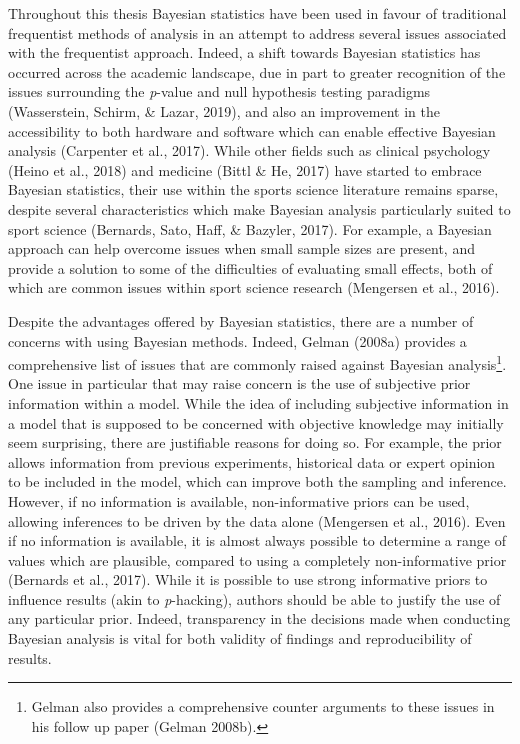 \documentclass[man,floatsintext]{apa6}
\let\rmarkdownfootnote\footnote%
\def\footnote{\protect\rmarkdownfootnote}
\begin{document}
Throughout this thesis Bayesian statistics have been used in favour of traditional frequentist methods of analysis in an attempt to address several issues associated with the frequentist approach.
Indeed, a shift towards Bayesian statistics has occurred across the academic landscape, due in part to greater recognition of the issues surrounding the \emph{p}-value and null hypothesis testing paradigms (Wasserstein, Schirm, \& Lazar, 2019), and also an improvement in the accessibility to both hardware and software which can enable effective Bayesian analysis (Carpenter et al., 2017).
While other fields such as clinical psychology (Heino et al., 2018) and medicine (Bittl \& He, 2017) have started to embrace Bayesian statistics, their use within the sports science literature remains sparse, despite several characteristics which make Bayesian analysis particularly suited to sport science (Bernards, Sato, Haff, \& Bazyler, 2017).
For example, a Bayesian approach can help overcome issues when small sample sizes are present, and provide a solution to some of the difficulties of evaluating small effects, both of which are common issues within sport science research (Mengersen et al., 2016).

Despite the advantages offered by Bayesian statistics, there are a number of concerns with using Bayesian methods.
Indeed, Gelman (2008a) provides a comprehensive list of issues that are commonly raised against Bayesian analysis\footnote{Gelman also provides a comprehensive counter arguments to these issues in his follow up paper (Gelman 2008b).}.
One issue in particular that may raise concern is the use of subjective prior information within a model.
While the idea of including subjective information in a model that is supposed to be concerned with objective knowledge may initially seem surprising, there are justifiable reasons for doing so.
For example, the prior allows information from previous experiments, historical data or expert opinion to be included in the model, which can improve both the sampling and inference.
However, if no information is available, non-informative priors can be used, allowing inferences to be driven by the data alone (Mengersen et al., 2016).
Even if no information is available, it is almost always possible to determine a range of values which are plausible, compared to using a completely non-informative prior (Bernards et al., 2017).
While it is possible to use strong informative priors to influence results (akin to \emph{p}-hacking), authors should be able to justify the use of any particular prior.
Indeed, transparency in the decisions made when conducting Bayesian analysis is vital for both validity of findings and reproducibility of results.
\end{document}
